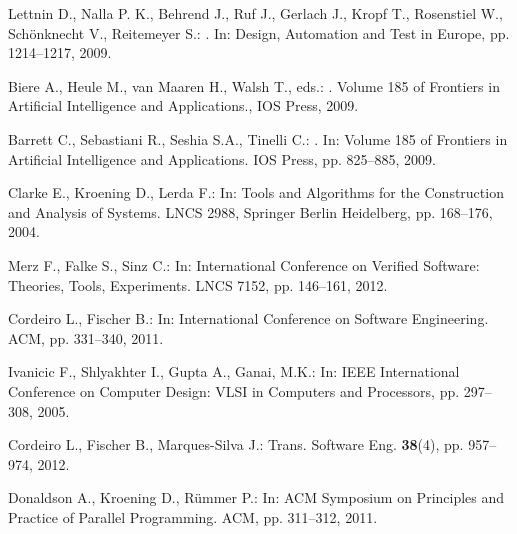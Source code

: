 \documentclass{acm_sen_article}
\begin{document}
\begin{thebibliography}{1}
Lettnin D., Nalla P. K., Behrend J., Ruf J., Gerlach J., Kropf T., Rosenstiel W., Sch{\"o}nknecht V., Reitemeyer S.:
. 
\newblock In: Design, Automation and Test in Europe, pp. 1214--1217, 2009.

Biere A., Heule M., van Maaren H., Walsh T., eds.:
.
\newblock Volume 185 of Frontiers in Artificial Intelligence and Applications., {IOS} Press, 2009.

Barrett C., Sebastiani R., Seshia S.A., Tinelli C.:
. 
\newblock In: Volume 185 of Frontiers in Artificial Intelligence and Applications. IOS Press, pp. 825--885, 2009.

Clarke E., Kroening D., Lerda F.:
\newblock In: Tools and Algorithms for the Construction and Analysis of Systems. LNCS 2988, Springer Berlin Heidelberg,  pp. 168--176, 2004.

Merz F., Falke S., Sinz C.:
\newblock In: International Conference on Verified Software: Theories, Tools, Experiments. LNCS 7152, pp. 146--161, 2012.

Cordeiro L., Fischer B.:
\newblock In: International Conference on Software Engineering. ACM,  pp. 331--340, 2011.

Ivanicic F., Shlyakhter I., Gupta A., Ganai, M.K.:
\newblock In: IEEE International Conference on Computer Design: VLSI in Computers and Processors, pp. 297--308, 2005.

Cordeiro L., Fischer B., Marques{-}Silva J.:
 Trans. Software Eng. \textbf{38}(4), pp. 957--974, 2012.

Donaldson A., Kroening D., R{\"{u}}mmer P.:
\newblock In: ACM Symposium on Principles and Practice of Parallel Programming. ACM, pp. 311--312, 2011.


\end{thebibliography}
\end{document}
